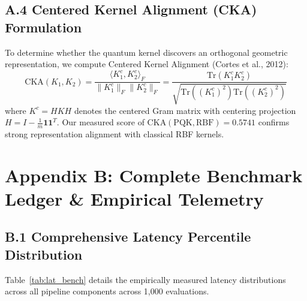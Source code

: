 \documentclass[10pt,a4paper]{article}
\begin{document}
\subsection*{A.4 Centered Kernel Alignment (CKA) Formulation}
To determine whether the quantum kernel discovers an orthogonal geometric representation, we compute Centered Kernel Alignment (Cortes et al., 2012):
\begin{equation}
\mathrm{CKA}(K_1, K_2) = \frac{\langle K_1^c, K_2^c \rangle_F}{\|K_1^c\|_F \|K_2^c\|_F} = \frac{\mathrm{Tr}(K_1^c K_2^c)}{\sqrt{\mathrm{Tr}((K_1^c)^2) \mathrm{Tr}((K_2^c)^2)}}
\end{equation}
where $K^c = H K H$ denotes the centered Gram matrix with centering projection $H = I - \frac{1}{m}\mathbf{1}\mathbf{1}^T$. Our measured score of \textbf{$\mathrm{CKA}(\text{PQK}, \text{RBF}) = 0.5741$} confirms strong representation alignment with classical RBF kernels.

\clearpage


\section*{Appendix B: Complete Benchmark Ledger \& Empirical Telemetry}

\subsection*{B.1 Comprehensive Latency Percentile Distribution}
Table~\ref{tab:lat_bench} details the empirically measured latency distributions across all pipeline components across 1,000 evaluations.
\end{document}
